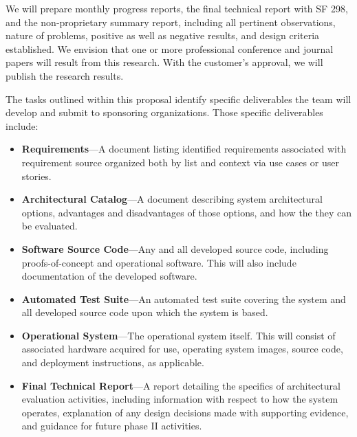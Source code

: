 \documentclass{sbir}
\begin{document}
We will prepare monthly progress reports, the final technical report with SF 298, and the non-proprietary summary report, including all pertinent observations, nature of problems, positive as well as negative results, and design criteria established. We envision that one or more professional conference and journal papers will result from this research. With the customer's approval, we will publish the research results.

The tasks outlined within this proposal identify specific deliverables the team will develop and submit to sponsoring organizations. Those specific deliverables include:

\begin{itemize}
\item {\bf Requirements}---A document listing identified requirements associated with requirement source organized both by list and context via use cases or user stories.
\item {\bf Architectural Catalog}---A document describing system architectural options, advantages and disadvantages of those options, and how the they can be evaluated.
\item {\bf Software Source Code}---Any and all developed source code, including proofs-of-concept and operational software. This will also include documentation of the developed software.
\item {\bf Automated Test Suite}---An automated test suite covering the system and all developed source code upon which the system is based.
\item {\bf Operational System}---The operational system itself. This will consist of associated hardware acquired for use, operating system images, source code, and deployment instructions, as applicable.
\item {\bf Final Technical Report}---A report detailing the specifics of architectural evaluation activities, including information with respect to how the system operates, explanation of any design decisions made with supporting evidence, and guidance for future phase II activities.
\end{itemize}

\end{document}
